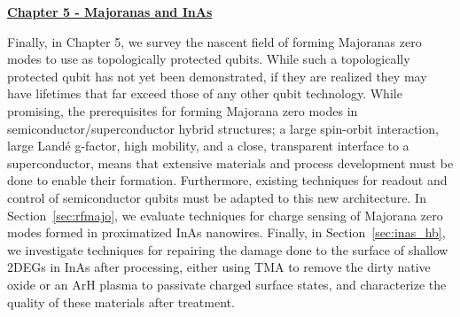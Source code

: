 \medskip
\noindent\textbf{\hyperref[sec:majoinas]{Chapter 5 - Majoranas and InAs}}

\noindent
Finally, in Chapter 5, we survey the nascent field of forming Majoranas zero modes to use as topologically protected qubits. While
such a topologically protected qubit has not yet been demonstrated, if they are realized they may have lifetimes that far exceed those of
any other qubit technology. While promising, the prerequisites for forming Majorana zero modes in semiconductor/superconductor hybrid structures;
a large spin-orbit interaction, large Land\'e g-factor, high mobility, and a close, transparent interface to a superconductor, means that extensive
materials and process development must be done to enable their formation. Furthermore, existing techniques for readout and control of semiconductor
qubits must be adapted to this new architecture. In Section~\ref{sec:rfmajo}, we evaluate techniques for charge sensing of Majorana zero modes formed
in proximatized InAs nanowires. Finally, in Section~\ref{sec:inas_hb}, we investigate techniques for repairing the damage done to the surface of shallow
2DEGs in InAs after processing, either using TMA to remove the dirty native oxide or an ArH plasma to passivate charged surface states, and characterize
the quality of these materials after treatment.